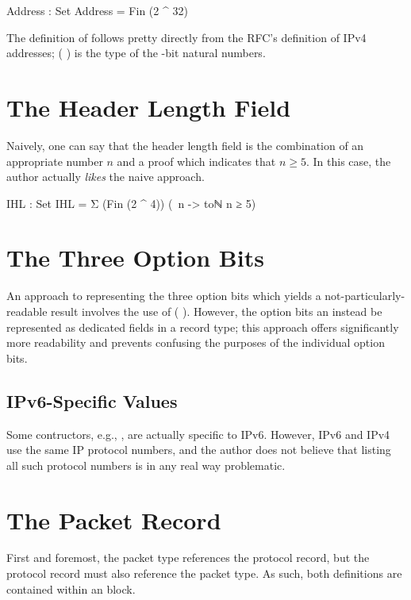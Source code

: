 \documentclass{report}
\begin{document}
\begin{itemize}
\begin{code}
  Address : Set
  Address = Fin (2 ^ 32)
\end{code}

The definition of  follows pretty directly from the RFC's definition of IPv4 addresses;  \AgdaSymbol( \AgdaOperator{\AgdaFunction{^}} \AgdaSymbol) is the type of the -bit natural numbers.

\section{The Header Length Field}
Naively, one can say that the header length field is the combination of an appropriate  number \(n\) and a proof which indicates that \(n \geq 5\).  In this case, the author actually \emph{likes} the naive approach.

\begin{code}
  IHL : Set
  IHL = Σ (Fin (2 ^ 4)) (\ n -> toℕ n ≥ 5)
\end{code}

\section{The Three Option Bits}
An approach to representing the three option bits which yields a not-particularly-readable result involves the use of  \AgdaSymbol( \AgdaOperator{\AgdaFunction{\circumflex}} \AgdaSymbol).  However, the option bits an instead be represented as dedicated  fields in a record type; this approach offers significantly more readability and prevents confusing the purposes of the individual option bits.

\subsection{IPv6-Specific Values}
Some  contructors, e.g., , are actually specific to IPv6.  However, IPv6 and IPv4 use the same IP protocol numbers, and the author does not believe that listing all such protocol numbers is in any real way problematic.

\section{The Packet Record}
First and foremost, the packet type references the protocol record, but the protocol record must also reference the packet type.  As such, both definitions are contained within an   block.


\end{itemize}
\end{document}

